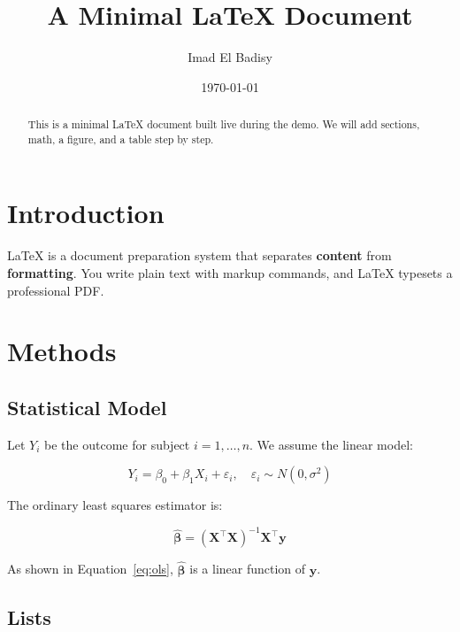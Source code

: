 \documentclass[12pt, a4paper]{article}
\title{A Minimal LaTeX Document}
\author{Imad El Badisy}
\date{\today}
\begin{document}
\maketitle

\begin{abstract}
  This is a minimal LaTeX document built live during the demo.
  We will add sections, math, a figure, and a table step by step.
\end{abstract}

\section{Introduction}

LaTeX is a document preparation system that separates
\textbf{content} from \textbf{formatting}.
You write plain text with markup commands, and LaTeX
typesets a professional PDF.


\section{Methods}

\subsection{Statistical Model}

Let $Y_i$ be the outcome for subject $i = 1, \ldots, n$.
We assume the linear model:

\begin{equation}
  Y_i = \beta_0 + \beta_1 X_i + \varepsilon_i,
  \quad \varepsilon_i \sim N(0, \sigma^2)
  \label{eq:lm}
\end{equation}

The ordinary least squares estimator is:

\begin{equation}
  \hat{\boldsymbol{\beta}} =
  (\mathbf{X}^\top \mathbf{X})^{-1} \mathbf{X}^\top \mathbf{y}
  \label{eq:ols}
\end{equation}

As shown in Equation~\ref{eq:ols}, $\hat{\boldsymbol{\beta}}$
is a linear function of $\mathbf{y}$.


\subsection{Lists}
\end{document}
